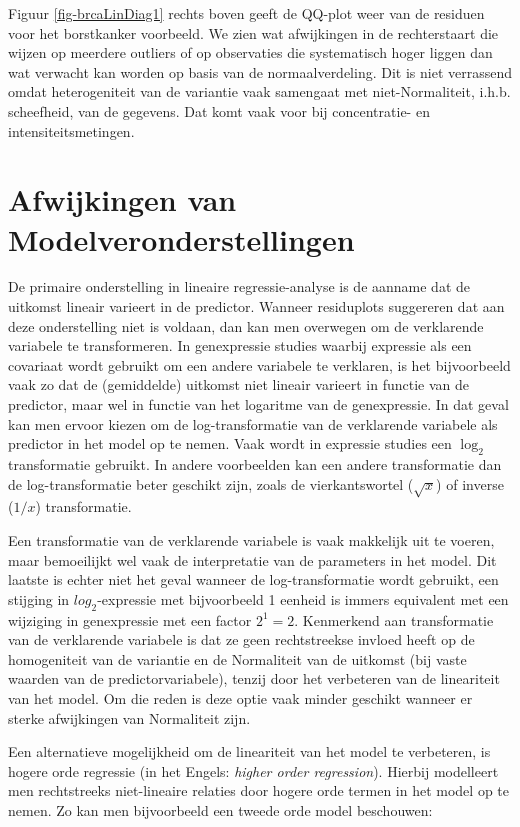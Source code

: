 \documentclass[
  dutch,
  letterpaper,
  12pt]{book}
\theoremstyle{definition}
\theoremstyle{definition}
\theoremstyle{definition}
\theoremstyle{remark}
\begin{document}
Figuur \ref{fig-brcaLinDiag1} rechts boven geeft de QQ-plot weer van de
residuen voor het borstkanker voorbeeld. We zien wat afwijkingen in de
rechterstaart die wijzen op meerdere outliers of op observaties die
systematisch hoger liggen dan wat verwacht kan worden op basis van de
normaalverdeling. Dit is niet verrassend omdat heterogeniteit van de
variantie vaak samengaat met niet-Normaliteit, i.h.b. scheefheid, van de
gegevens. Dat komt vaak voor bij concentratie- en intensiteitsmetingen.

\section{Afwijkingen van
Modelveronderstellingen}\label{afwijkingen-van-modelveronderstellingen}

De primaire onderstelling in lineaire regressie-analyse is de aanname
dat de uitkomst lineair varieert in de predictor. Wanneer residuplots
suggereren dat aan deze onderstelling niet is voldaan, dan kan men
overwegen om de verklarende variabele te transformeren. In genexpressie
studies waarbij expressie als een covariaat wordt gebruikt om een andere
variabele te verklaren, is het bijvoorbeeld vaak zo dat de (gemiddelde)
uitkomst niet lineair varieert in functie van de predictor, maar wel in
functie van het logaritme van de genexpressie. In dat geval kan men
ervoor kiezen om de log-transformatie van de verklarende variabele als
predictor in het model op te nemen. Vaak wordt in expressie studies een
\(\log_2\) transformatie gebruikt. In andere voorbeelden kan een andere
transformatie dan de log-transformatie beter geschikt zijn, zoals de
vierkantswortel (\(\sqrt{x}\)) of inverse (\(1/x\)) transformatie.

Een transformatie van de verklarende variabele is vaak makkelijk uit te
voeren, maar bemoeilijkt wel vaak de interpretatie van de parameters in
het model. Dit laatste is echter niet het geval wanneer de
log-transformatie wordt gebruikt, een stijging in \(log_2\)-expressie
met bijvoorbeeld 1 eenheid is immers equivalent met een wijziging in
genexpressie met een factor \(2^1=2\). Kenmerkend aan transformatie van
de verklarende variabele is dat ze geen rechtstreekse invloed heeft op
de homogeniteit van de variantie en de Normaliteit van de uitkomst (bij
vaste waarden van de predictorvariabele), tenzij door het verbeteren van
de lineariteit van het model. Om die reden is deze optie vaak minder
geschikt wanneer er sterke afwijkingen van Normaliteit zijn.

Een alternatieve mogelijkheid om de lineariteit van het model te
verbeteren, is hogere orde regressie (in het Engels: \emph{higher order
regression}). Hierbij modelleert men rechtstreeks niet-lineaire relaties
door hogere orde termen in het model op te nemen. Zo kan men
bijvoorbeeld een tweede orde model beschouwen:
\end{document}
